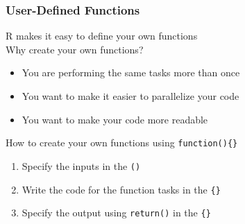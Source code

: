 \documentclass{beamer}\usepackage[]{graphicx}\usepackage[]{color}
\begin{document}
\begin{frame}\frametitle{User-Defined Functions}
    R makes it easy to define your own functions \\
    \vspace{2ex}
    Why create your own functions?
    \begin{itemize}
        \item You are performing the same tasks more than once
        \item You want to make it easier to parallelize your code
        \item You want to make your code more readable
    \end{itemize}
    \vspace{2ex}
    How to create your own functions using \texttt{function()\{\}}
    \begin{enumerate}
        \item Specify the inputs in the \texttt{()}
        \item Write the code for the function tasks in the \texttt{\{\}}
        \item Specify the output using \texttt{return()} in the \texttt{\{\}}
    \end{enumerate}
\end{frame}
\end{document}
